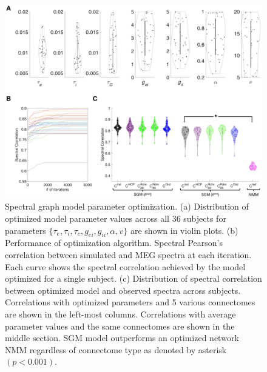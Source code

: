 \begin{figure}[htbp]
    \centering
    \includegraphics[width=\textwidth]{../figures/chapter5/fig4_violin.png}
    \caption{Spectral graph model parameter optimization. (a) Distribution of optimized model parameter values across all 36 subjects for parameters $\{\tau_e, \tau_i, \tau_c, g_{ei}, g_{ii}, \alpha, v\}$ are shown in violin plots. (b) Performance of optimization algorithm. Spectral Pearson's correlation between simulated and MEG spectra at each iteration. Each curve shows the spectral correlation achieved by the model optimized for a single subject. (c) Distribution of spectral correlation between optimized model and observed spectra across subjects. Correlations with optimized parameters and 5 various connectomes are shown in the left-most columns. Correlations with average parameter values and the same connectomes are shown in the middle section. SGM model outperforms an optimized network NMM regardless of connectome type as denoted by asterisk $(p < 0.001)$.}
    \label{fig:violin}
\end{figure}

